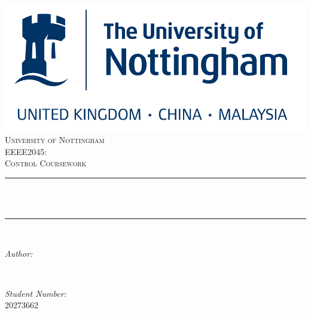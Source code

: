 \begin{titlepage}
    \centering
    \vspace*{0.5 cm}
    \includegraphics[scale = 0.4]{uon.png}\\[1.0 cm]	%

    
    \textsc{\LARGE University of Nottingham}\\[2.0 cm]	%
    \textsc{\Large EEEE2045:}\\[0.5 cm]				%
    \textsc{\large Control Coursework}\\[0.5 cm]				%


    \rule{\linewidth}{0.2 mm} \\[0.4 cm]
    { \huge \bfseries \thetitle}\\
    \rule{\linewidth}{0.2 mm} \\[1.5 cm]

    \begin{minipage}{0.4\textwidth}
        \begin{flushleft} \large
            \emph{Author:}\\
            \theauthor
        \end{flushleft}
    \end{minipage}~
    \begin{minipage}{0.4\textwidth}
        \begin{flushright} \large
            \emph{Student Number:} \\
            20273662									%
        \end{flushright}
    \end{minipage}\\[2 cm]

    {\large \thedate}\\[2 cm]

    \vfill

\end{titlepage}